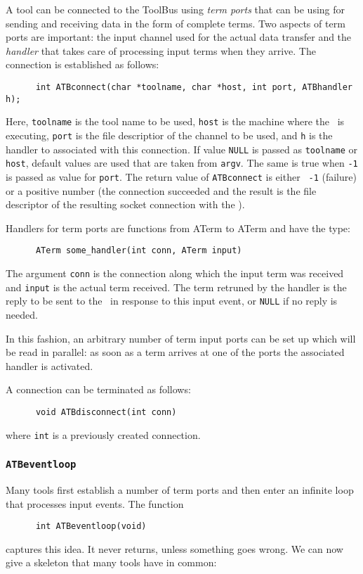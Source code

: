 \documentclass[twoside]{article} %
\begin{document}
A tool can be connected to the ToolBus using {\em term ports} that can be
using for sending and receiving data in the form of complete terms.  Two
aspects of term ports are important: the input channel used for the actual
data transfer and the {\em handler} that takes care of processing input terms
when they arrive. The connection is established as follows:

\begin{verbatim}
      int ATBconnect(char *toolname, char *host, int port, ATBhandler h);
\end{verbatim}

Here, {\tt toolname} is the tool name to be used, {\tt host} is the machine
where the \TB\ is executing, {\tt port} is the file descriptior of the channel
to be used, and {\tt h} is the handler to associated with this connection.  If
value {\tt NULL} is passed as {\tt toolname} or {\tt host}, default values are
used that are taken from {\tt argv}.  The same is true when {\tt -1} is passed
as value for {\tt port}. The return value of {\tt ATBconnect} is either {\tt
  -1} (failure) or a positive number (the connection succeeded and the result
is the file descriptor of the resulting socket connection with the \TB).

Handlers for term ports are functions from ATerm to ATerm and have the
type:
\begin{verbatim}
      ATerm some_handler(int conn, ATerm input)
\end{verbatim}
The argument {\tt conn} is the connection along which the
input term was received and {\tt input} is the actual term received.
The term retruned by the handler is the reply to be sent  to the \TB\ in response
to this input event, or {\tt NULL} if no reply is needed.

In this fashion, an arbitrary number of term input ports can be set up which
will be read in parallel: as soon as a term arrives at one of the ports
the associated handler is activated.

A connection can be terminated as follows:
\begin{verbatim}
      void ATBdisconnect(int conn)
\end{verbatim}
where {\tt int} is a previously created connection.

\subsubsection{\label{ATBeventloop}{\tt ATBeventloop}}
Many tools first establish a number of term ports
and then enter an infinite loop that processes input events.
The function
\begin{verbatim}
      int ATBeventloop(void)
\end{verbatim}
captures this idea. It never returns, unless something goes wrong.
We can now give a skeleton that many tools have in common:
\end{document}
